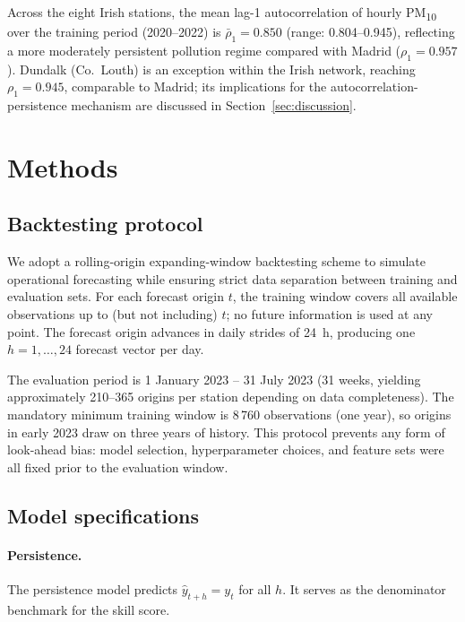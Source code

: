 \documentclass[12pt,a4paper]{article}
\newcommand{\PMten}{PM\textsubscript{10}}
\begin{document}
Across the eight Irish stations, the mean lag-1 autocorrelation of hourly
\PMten{} over the training period (2020--2022) is $\bar{\rho}_1 = 0.850$
(range: 0.804--0.945), reflecting a more moderately persistent pollution
regime compared with Madrid ($\rho_1 = 0.957$).  Dundalk (Co.\ Louth) is an
exception within the Irish network, reaching $\rho_1 = 0.945$, comparable to
Madrid; its implications for the autocorrelation-persistence mechanism are
discussed in Section~\ref{sec:discussion}.

\section{Methods}
\label{sec:methods}

\subsection{Backtesting protocol}

We adopt a rolling-origin expanding-window backtesting scheme to simulate
operational forecasting while ensuring strict data separation between training
and evaluation sets.  For each forecast origin $t$, the training window covers
all available observations up to (but not including) $t$; no future information
is used at any point.  The forecast origin advances in daily strides of 24~h,
producing one $h = 1, \ldots, 24$ forecast vector per day.

The evaluation period is 1 January 2023 -- 31 July 2023 (31 weeks, yielding
approximately 210--365 origins per station depending on data completeness).
The mandatory minimum training window is 8\,760 observations (one year), so
origins in early 2023 draw on three years of history.  This protocol prevents
any form of look-ahead bias: model selection, hyperparameter choices, and
feature sets were all fixed prior to the evaluation window.

\subsection{Model specifications}

\paragraph{Persistence.}
The persistence model predicts $\hat{y}_{t+h} = y_t$ for all $h$.  It serves
as the denominator benchmark for the skill score.
\end{document}
